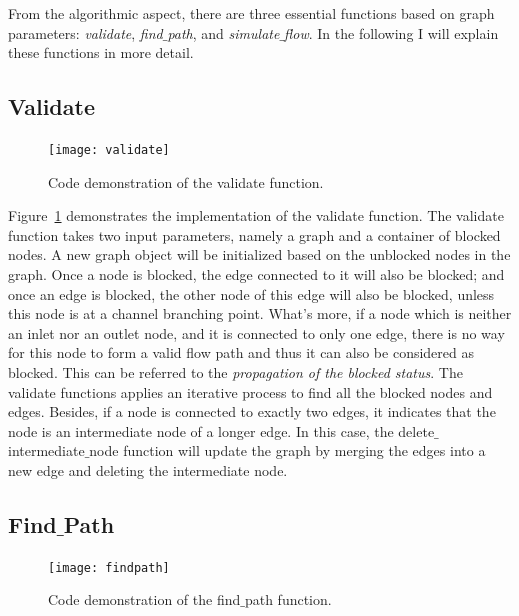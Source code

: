 \documentclass{article}
\begin{document}
From the algorithmic aspect, there are three essential functions based on graph parameters: \textit{validate}, \textit{find$\_$path}, and \textit{simulate$\_$flow}.
In the following I will explain these functions in more detail. 

\subsection{Validate}

\begin{figure}
\caption{Code demonstration of the validate function.}
\texttt{[image: validate]}
\label{fig:code_validate}
\end{figure}

Figure~\ref{fig:code_validate} demonstrates the implementation of the validate function.
The validate function takes two input parameters, namely a graph and a container of blocked nodes.
A new graph object will be initialized based on the unblocked nodes in the graph.
Once a node is blocked, the edge connected to it will also be blocked;
and once an edge is blocked, the other node of this edge will also be blocked, unless this node is at a channel branching point.
What's more, if a node which is neither an inlet nor an outlet node, and it is connected to only one edge, there is no way for this node to form a valid flow path and thus it can also be considered as blocked.
This can be referred to the \textit{propagation of the blocked status}. 
The validate functions applies an iterative process to find all the blocked nodes and edges.
Besides, if a node is connected to exactly two edges,
it indicates that the node is an intermediate node of a longer edge.
In this case, the delete$\_$intermediate$\_$node function will update the graph by merging the edges into a new edge and deleting the intermediate node.

\subsection{Find$\_$Path}
\begin{figure}
\caption{Code demonstration of the find$\_$path function.}
\texttt{[image: findpath]}
\label{fig:findpath}
\end{figure}
\end{document}
